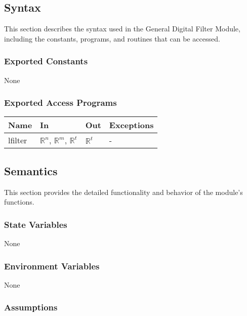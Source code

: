 \documentclass[12pt, titlepage]{article}
\begin{document}
\subsection{Syntax}

This section describes the syntax used in the General Digital Filter Module,
including the constants, programs, and routines that can be accessed.

\subsubsection{Exported Constants}

None

\subsubsection{Exported Access Programs}

\begin{center}
\begin{tabular}{p{2cm} p{4cm} p{4cm} p{2cm}}
\hline
\textbf{Name} & \textbf{In} & \textbf{Out} & \textbf{Exceptions} \\
\hline
lfilter & $\mathbb{R}^n$, $\mathbb{R}^m$, $\mathbb{R}^t$ & $\mathbb{R}^t$ & - \\
\hline
\end{tabular}
\end{center}

\subsection{Semantics}

This section provides the detailed functionality and behavior of the module’s
functions.

\subsubsection{State Variables}

None

\subsubsection{Environment Variables}

None

\subsubsection{Assumptions}
\end{document}
